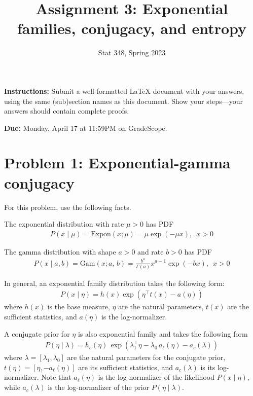 \documentclass{article}
\title{Assignment 3: Exponential families, conjugacy, and entropy}
\date{}
\author{Stat 348, Spring 2023}
\begin{document}
\maketitle

\vspace{-2em}
\textbf{Instructions:} Submit a well-formatted LaTeX document with your answers, using the same (sub)section names as this document. Show your steps---your answers should contain complete proofs.

\textbf{Due:} Monday, April 17 at 11:59PM on GradeScope.

\section*{Problem 1: Exponential-gamma conjugacy}
For this problem, use the following facts.

The exponential distribution with rate $\mu>0$ has PDF
\begin{align}
\label{eq:expon}
P(x \mid \mu) = \textrm{Expon}(x; \mu) =  \mu \exp(-\mu x), \,\,\, x>0
\end{align}

The gamma distribution with shape $a>0$ and rate $b>0$ has PDF
\begin{align}
\label{eq:gamma}
P(x \mid a, b) = \textrm{Gam}(x; a,\,b) = \frac{b^a}{\Gamma(a)} x^{a-1} \exp(-bx), \,\,\, x>0
\end{align}

In general, an exponential family distribution takes the following form:
\begin{align}
\label{eq:expfam}
P(x \mid \eta) = h(x) \exp\left(\eta^\top t(x) - a(\eta)\right)
\end{align}
where $h(x)$ is the base measure, $\eta$ are the natural parameters, $t(x)$ are the sufficient statistics, and $a(\eta)$ is the log-normalizer.

A conjugate prior for $\eta$ is also exponential family and takes the following form
\begin{align}
\label{eq:conjugate}
P(\eta \mid \lambda) = h_c(\eta) \, \exp\left(\lambda_1^\top \eta - \lambda_0 \, a_\ell(\eta) -a_c(\lambda)\right)
\end{align}
where $\lambda = [\lambda_1, \lambda_0]$ are the natural parameters for the conjugate prior, $t(\eta)=[\eta, -a_\ell(\eta)]$ are its sufficient statistics, and $a_c(\lambda)$ is its log-normalizer. Note that $a_\ell(\eta)$ is the log-normalizer of the likelihood $P(x \mid \eta)$, while $a_c(\lambda)$ is the log-normalizer of the prior $P(\eta \mid \lambda)$.
\end{document}
